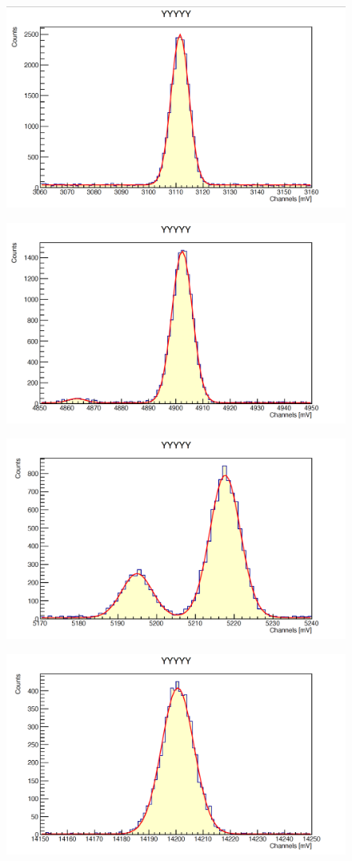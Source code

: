 \documentclass[a4paper,10pt]{article}
\begin{document}
\begin{figure}[H]
    \centering
    \includegraphics[scale=0.45]{appendice/y3}
\end{figure}
\begin{figure}[H]
    \centering
    \includegraphics[scale=0.45]{appendice/y4}
\end{figure}
\begin{figure}[H]
    \centering
    \includegraphics[scale=0.45]{appendice/y5}
\end{figure}
\begin{figure}[H]
    \centering
    \includegraphics[scale=0.45]{appendice/y10}
\end{figure}
\end{document}
